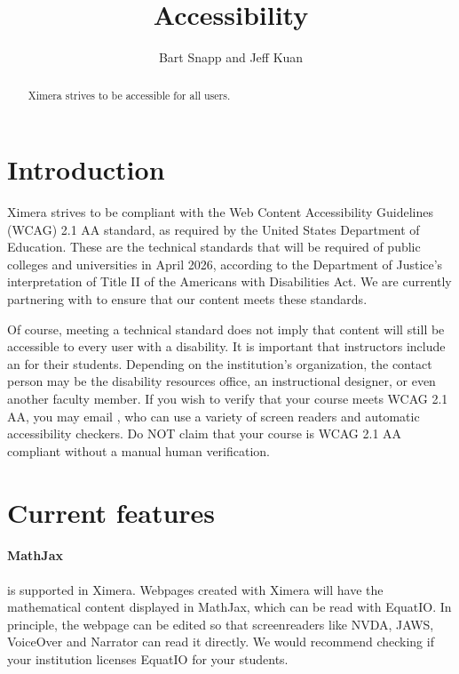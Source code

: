 \documentclass{ximera}
\author{Bart Snapp and Jeff Kuan}
\title{Accessibility}
\begin{document}
\begin{abstract}
Ximera strives to be accessible for all users.
\end{abstract}
\maketitle

\section{Introduction}
Ximera strives to be compliant with the Web Content Accessibility Guidelines (WCAG) 2.1 AA standard, as required by the United States
Department of Education. These are the technical standards that will be required of public colleges and universities in April 2026, 
according to the Department of Justice's interpretation of Title II of the Americans with Disabilities Act. 
We are currently partnering with  
to ensure that our content meets these standards.

Of course, meeting a technical standard does not imply that content will still be accessible to every user with a disability. 
It is important that instructors include an  for their
students. Depending on the institution's organization, the contact person may be the disability resources office, an instructional designer, 
or even another faculty member. If you wish to verify that your course meets WCAG 2.1 AA, you may email ,
who can use a variety of screen readers and automatic accessibility checkers. Do NOT claim that your course is WCAG 2.1 AA compliant
without a manual human verification. 

\section{Current features}

\paragraph{MathJax} is supported in Ximera.
Webpages created with Ximera will have the mathematical content displayed in MathJax, which can be read with EquatIO. In principle, the webpage 
can be edited so that screenreaders like NVDA, JAWS, VoiceOver and Narrator can read it directly. We would recommend checking if your
institution licenses EquatIO for your students. 
\end{document}
